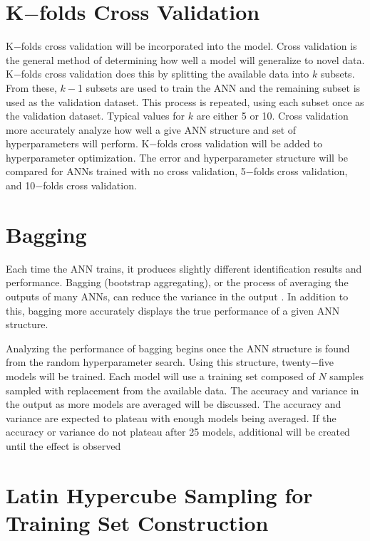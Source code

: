 \documentclass[tocnosub,noragright,centerchapter,12pt,fullpage]{uiucecethesis09}
\begin{document}
\section{K$-$folds Cross Validation}
K$-$folds cross validation will be incorporated into the model. Cross validation is the general method of determining how well a model will generalize to novel data. K$-$folds cross validation does this by splitting the available data into $k$ subsets. From these, $k-$1 subsets are used to train the ANN and the remaining subset is used as the validation dataset. This process is repeated, using each subset once as the validation dataset. Typical values for $k$ are either 5 or 10. Cross validation more accurately analyze how well a give ANN structure and set of hyperparameters will perform. K$-$folds cross validation will be added to hyperparameter optimization. The error and hyperparameter structure will be compared for ANNs trained with no cross validation, 5$-$folds cross validation, and 10$-$folds cross validation.

\section{Bagging}
Each time the ANN trains, it produces slightly different identification results and performance. Bagging (bootstrap aggregating), or the process of averaging the outputs of many ANNs, can reduce the variance in the output \cite{Breiman1996}. In addition to this, bagging more accurately displays the true performance of a given ANN structure.

Analyzing the performance of bagging begins once the ANN structure is found from the random hyperparameter search. Using this structure, twenty$-$five models will be trained. Each model will use a training set composed of $N$ samples sampled with replacement from the available data. The accuracy and variance in the output as more models are averaged will be discussed. The accuracy and variance are expected to plateau with enough models being averaged. If the accuracy or variance do not plateau after 25 models, additional will be created until the effect is observed



\section{Latin Hypercube Sampling for Training Set Construction}
\end{document}
